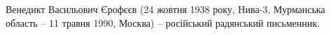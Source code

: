  
 
 
 
 

Венедикт Васильович Єрофєєв (24 жовтня 1938 року, Нива-3, Мурманська область –
11 травня 1990, Москва) – російський радянський письменник.

